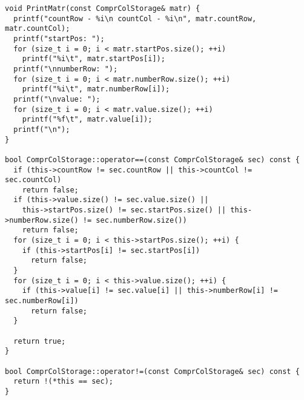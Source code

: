 \documentclass{report}
\begin{document}
\begin{lstlisting}
void PrintMatr(const ComprColStorage& matr) {
  printf("countRow - %i\n countCol - %i\n", matr.countRow, matr.countCol);
  printf("startPos: ");
  for (size_t i = 0; i < matr.startPos.size(); ++i)
    printf("%i\t", matr.startPos[i]);
  printf("\nnumberRow: ");
  for (size_t i = 0; i < matr.numberRow.size(); ++i)
    printf("%i\t", matr.numberRow[i]);
  printf("\nvalue: ");
  for (size_t i = 0; i < matr.value.size(); ++i)
    printf("%f\t", matr.value[i]);
  printf("\n");
}

bool ComprColStorage::operator==(const ComprColStorage& sec) const {
  if (this->countRow != sec.countRow || this->countCol != sec.countCol)
    return false;
  if (this->value.size() != sec.value.size() ||
    this->startPos.size() != sec.startPos.size() || this->numberRow.size() != sec.numberRow.size())
    return false;
  for (size_t i = 0; i < this->startPos.size(); ++i) {
    if (this->startPos[i] != sec.startPos[i])
      return false;
  }
  for (size_t i = 0; i < this->value.size(); ++i) {
    if (this->value[i] != sec.value[i] || this->numberRow[i] != sec.numberRow[i])
      return false;
  }

  return true;
}

bool ComprColStorage::operator!=(const ComprColStorage& sec) const {
  return !(*this == sec);
}
\end{lstlisting}
\end{document}
